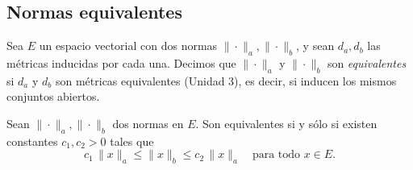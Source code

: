 \subsection{Normas equivalentes}

\begin{defi}
Sea $E$ un espacio vectorial con dos normas $\|\cdot\|_a,\|\cdot\|_b$, y
sean $d_a,d_b$ las métricas inducidas por cada una. Decimos que
$\|\cdot\|_a$ y $\|\cdot\|_b$ son \emph{equivalentes} si $d_a$ y $d_b$
son métricas equivalentes (Unidad 3), es decir, si inducen los mismos
conjuntos abiertos.
\end{defi}

\begin{prop}
Sean $\|\cdot\|_a,\|\cdot\|_b$ dos normas en $E$. Son equivalentes si y
sólo si existen constantes $c_1,c_2>0$ tales que
\[
c_1\,\|x\|_a \le \|x\|_b \le c_2\,\|x\|_a \quad \text{para todo }
x\in E.
\]
\end{prop}

